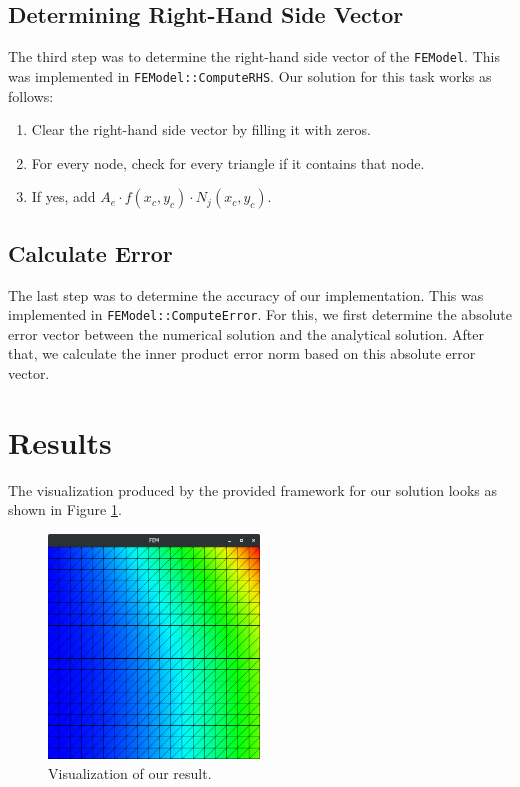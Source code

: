 \documentclass[11pt]{article}
\begin{document}
        \subsection{Determining Right-Hand Side Vector}
        \label{sec:rhsvector}
        The third step was to determine the right-hand side vector of the \texttt{FEModel}. This was implemented in \texttt{FEModel::ComputeRHS}. Our solution for this task works as follows:

        \begin{enumerate}
            \item Clear the right-hand side vector by filling it with zeros.
            \item For every node, check for every triangle if it contains that node.
            \item If yes, add $A_e \cdot f(x_c, y_c) \cdot N_j(x_c, y_c)$.
        \end{enumerate}       


        \subsection{Calculate Error}
        \label{sec:solveerror}
        The last step was to determine the accuracy of our implementation. This was implemented in \texttt{FEModel::ComputeError}. For this, we first determine the absolute error vector between the numerical solution and the analytical solution. After that, we calculate the inner product error norm based on this absolute error vector.


    \section{Results}
    \label{sec:results}
    The visualization produced by the provided framework for our solution looks as shown in Figure \ref{fig:res}.

    \begin{figure}[H]
        \centering
        \includegraphics[width=0.5\textwidth]{res}
        \caption{Visualization of our result.}
        \label{fig:res}
    \end{figure}
\end{document}
